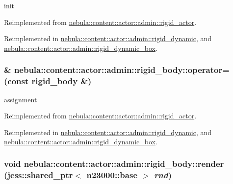 init 

Reimplemented from \hyperlink{classnebula_1_1content_1_1actor_1_1admin_1_1rigid__actor_a4de1558a31bb13bcf92279a4d823ddbb}{nebula::content::actor::admin::rigid\_\-actor}.

Reimplemented in \hyperlink{classnebula_1_1content_1_1actor_1_1admin_1_1rigid__dynamic_af30bd690cfa2d1a98b1458c658dc97d6}{nebula::content::actor::admin::rigid\_\-dynamic}, and \hyperlink{classnebula_1_1content_1_1actor_1_1admin_1_1rigid__dynamic__box_a3d03f28e3ba455be0f39ad66e00c02c9}{nebula::content::actor::admin::rigid\_\-dynamic\_\-box}.\hypertarget{classnebula_1_1content_1_1actor_1_1admin_1_1rigid__body_a7ed8ba2a35fdf83cf508fe37fde0d875}{
\subsubsection[{operator=}]{\& nebula::content::actor::admin::rigid\_\-body::operator= (const {\bf rigid\_\-body} \&)}}
\label{classnebula_1_1content_1_1actor_1_1admin_1_1rigid__body_a7ed8ba2a35fdf83cf508fe37fde0d875}


assignment 

Reimplemented from \hyperlink{classnebula_1_1content_1_1actor_1_1admin_1_1rigid__actor_a633100102ba359becd477f46159270de}{nebula::content::actor::admin::rigid\_\-actor}.

Reimplemented in \hyperlink{classnebula_1_1content_1_1actor_1_1admin_1_1rigid__dynamic_accf38f3f07acdbe924c46388230d2e99}{nebula::content::actor::admin::rigid\_\-dynamic}, and \hyperlink{classnebula_1_1content_1_1actor_1_1admin_1_1rigid__dynamic__box_aeed451b7d00e75948f474e4bb20404ba}{nebula::content::actor::admin::rigid\_\-dynamic\_\-box}.\hypertarget{classnebula_1_1content_1_1actor_1_1admin_1_1rigid__body_a88b9c26608737c7850b4eef227548a59}{
\subsubsection[{render}]{\setlength{\rightskip}{0pt plus 5cm}void nebula::content::actor::admin::rigid\_\-body::render (jess::shared\_\-ptr$<$ {\bf n23000::base} $>$ {\em rnd})}}
\label{classnebula_1_1content_1_1actor_1_1admin_1_1rigid__body_a88b9c26608737c7850b4eef227548a59}


